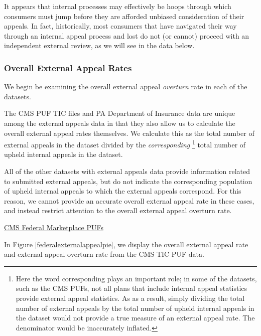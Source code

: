 \documentclass[12pt, a4paper,twoside,parskip=full]{report}
\theoremstyle{plain} %
\theoremstyle{definition} %
\theoremstyle{remark} %
\numberwithin{equation}{chapter}
\begin{document}
		It appears that internal processes may effectively be hoops through which consumers must jump before they are afforded unbiased consideration of their appeals. In fact, historically, most consumers that have navigated their way through an internal appeal process and lost do not (or cannot) proceed with an independent external review, as we will see in the data below.
		
		\subsubsection{Overall External Appeal Rates}
		
		We begin be examining the overall external appeal \emph{overturn} rate in each of the datasets.
		
		The CMS PUF TIC files and PA Department of Insurance data are unique among the external appeals data in that they also allow us to calculate the overall external appeal rates themselves. We calculate this as the total number of external appeals in the dataset divided by the \emph{corresponding} \footnote{Here the word corresponding plays an important role; in some of the datasets, such as the CMS PUFs, not all plans that include internal appeal statistics provide external appeal statistics. As as a result, simply dividing the total number of external appeals by the total number of upheld internal appeals in the dataset would not provide a true measure of an external appeal rate. The denominator would be inaccurately inflated.} total number of upheld internal appeals in the dataset.
		
		All of the other datasets with external appeals data provide information related to submitted external appeals, but do not indicate the corresponding population of upheld internal appeals to which the external appeals correspond. For this reason, we cannot provide an accurate overall external appeal rate in these cases, and instead restrict attention to the overall external appeal overturn rate.
		
		\underline{CMS Federal Marketplace PUFs}
		
		In Figure \ref{federalexternalappealpie}, we display the overall external appeal rate and external appeal overturn rate from the CMS TIC PUF data.
		
\end{document}
